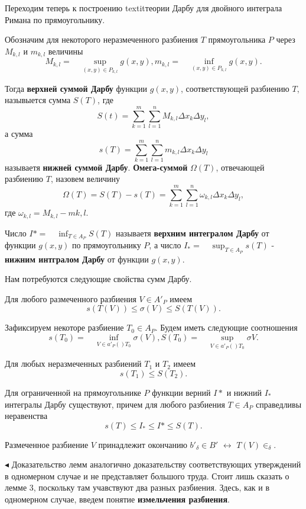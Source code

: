 \par Переходим теперь к построению textit{теории Дарбу} для двойного интеграла Римана по прямоугольнику.
\par Обозначим для некоторого неразмеченного разбиения $T$ прямоугольника $P$ через $M_{k,l}$ и $m_{k,l}$ величины $$M_{k,l}=\quad \sup_{(x,y)\in P_{k,l}} g(x,y), m_{k,l}=\quad \inf_{(x,y)\in P_{k,l}} g(x,y).$$
\par Тогда \textbf{верхней суммой Дарбу} функции $g(x,y)$, соответствующей разбиению $T$, назывыется сумма $S(T)$, где $$S(t)=\sum_{k=1}^m \sum_{l=1}^n M_{k,l}\Delta x_k\Delta y_l,$$ а сумма $$s(T)=\sum_{k=1}^m \sum_{l=1}^n m_{k,l}\Delta x_k\Delta y_l$$ называетя \textbf{нижней суммой Дарбу}.
\textbf{Омега-суммой} $\Omega (T)$, отвечающей разбиению $T$, назовем величину $$\Omega (T)=S(T)-s(T)=\sum_{k=1}^m \sum_{l=1}^n \omega_{k,l}\Delta x_k\Delta y_l,$$ где $\omega_{k,l}=M_{k,l}-m{k,l}$.
\begin{object}
Число $I*=\quad \inf_{T\in A_P} S(T)$ называетя \textbf{верхним интегралом Дарбу} от функции $g(x,y)$ по прямоугольнику $P$, а число $I_{*}=\quad \sup_{T\in A_P} s(T)$ - \textbf{нижним интгралом Дарбу} от функции $g(x,y)$.
\end{object}
\par Нам потребуются следующие свойства сумм Дарбу.
\begin{lemma} 
Для любого размеченного разбиения $V\in A'_P$ имеем $$s(T(V))\le \sigma (V)\le S(T(V)).$$
\end{lemma}
\begin{lemma} 
Зафиксируем некоторе разбиение $T_0\in A_P$. Будем иметь следующие соотношения $$s(T_0)=\quad \inf_{V\in a'_P()T_0} \sigma (V),S(T_0)=\quad \sup_{V\in a'_P()T_0} \sigma V.$$
\end{lemma} 
\begin{lemma} 
Для любых неразмеченных разбиений $T_1$ и $T_2$ имеем $$s(T_1)\le S(T_2).$$
\end{lemma} 
\begin{lemma} 
\label{lemmfour}
Для ограниченной на прямоугольнике $P$ функции верний $I*$ и нижний $I_{*}$ интегралы Дарбу существуют, причем для любого разбиения $T\in A_P$ справедливы неравенства $$s(T)\le I_{*}\le I*\le S(T).$$
\end{lemma} 
\begin{lemma}
Размеченное разбиение $V$ принадлежит окончанию $b'_{\delta}\in B'$ $\leftrightarrow$ $T(V)\in_{\delta}$.
\end{lemma}
$\blacktriangleleft$ Доказательство лемм аналогично доказательству соответствующих утверждений в одномерном случае и не представляет большого труда. Стоит лишь сказать о лемме 3, поскольку там учавствуют два разных разбиения. Здесь, как и в одномерном случае, введем понятие \textbf{измельчения разбиения}.
